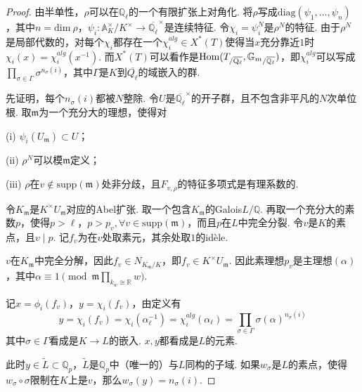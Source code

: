 \begin{proof}

    由半单性，$\rho$可以在$\mathbb{Q}_{\ell}$的一个有限扩张上对角化. 将$\rho$写成$\mathrm{diag}(\psi_1,\ldots,\psi_n)$，其中$n=\mathrm{dim}\ \rho$，$\psi_i: \mathbb{A}_{K}^{\times}/K^{\times}\to \overline{\mathbb{Q}_{\ell}}^{\times}$是连续特征.
    令$\chi_i = \psi_i^N$是$\rho^N$的特征. 由于$\rho^N$是局部代数的，对每个$\chi_i$都存在一个$\chi_i^{alg}\in X^{*}(T)$使得当$x$充分靠近$1$时$\chi_i(x) = \chi_i^{alg}(x^{-1})$. 而$X^{*}(T)$可以看作是$\mathrm{Hom}({T}_{/\overline{\mathrm{Q}_{\ell}}}, {\mathbb{G}_m}_{/\overline{\mathbb{Q}_{\ell}}})$，即$\chi_i^{alg}$可以写成$\prod_{\sigma\in \Gamma} \sigma^{n_{\sigma}(i)}$，其中$\Gamma$是$K$到$\overline{Q_{\ell}}$的域嵌入的群.

    \vskip0.3cm

    先证明，每个$n_{\sigma}(i)$都被$N$整除. 令$U$是$\overline{\mathbb{Q}_{\ell}}^{\times}$的开子群，且不包含非平凡的$N$次单位根. 取$\mathfrak{m}$为一个充分大的理想，使得对

    (i) $\psi_i(U_{\mathfrak{m}})\subset U$；

    (ii) $\rho^N$可以模$\mathfrak{m}$定义；

    (iii) $\rho$在$v\not\in \mathrm{supp}(\mathfrak{m})$处非分歧，且$F_{v, \rho}$的特征多项式是有理系数的.

    令$K_{\mathfrak{m}}$是$K^{\times} U_{\mathfrak{m}}$对应的Abel扩张. 取一个包含$K_{\mathfrak{m}}$的Galois$L/\mathbb{Q}$. 再取一个充分大的素数$p$，使得$p>\ell$，$p>p_v,\forall v\in \mathrm{supp}(\mathfrak{m})$，而且$p$在$L$中完全分裂. 令$v$是$K$的素点，且$v\mid p$. 记$f_v$为在$v$处取素元，其余处取$1$的idèle.

    $v$在$K_{\mathfrak{m}}$中完全分解，因此$f_v \in N_{K_{\mathfrak{m}}/K}$，即$f_v\in K^{\times} U_{\mathfrak{m}}$. 因此素理想$p_v$是主理想$(\alpha)$，其中$\alpha\equiv 1\pmod{\mathfrak{m}\prod_{k_w\cong \mathbb{R}} w}$.

    记$x = \phi_i(f_v)$，$y = \chi_i(f_v)$，由定义有
    \begin{equation}
        y = \chi_i(f_v) = \chi_i(\alpha^{-1}_{\ell}) = \chi_i^{alg}(\alpha_{\ell}) = \prod_{\sigma\in \Gamma} \sigma(\alpha)^{n_{\sigma}(i)}
    \end{equation}
    其中$\sigma\in \Gamma$看成是$K\to L$的嵌入. $x,y$都看成是$L$的元素.

    此时$y\in \tilde{L}\subset \mathbb{Q}_p$，$\tilde{L}$是$\mathbb{Q}_p$中（唯一的）与$L$同构的子域. 如果$w_{\sigma}$是$L$的素点，使得$w_{\sigma}\circ \sigma$限制在$K$上是$v$，那么$w_{\sigma}(y) = n_{\sigma}(i)$.


\end{proof}
